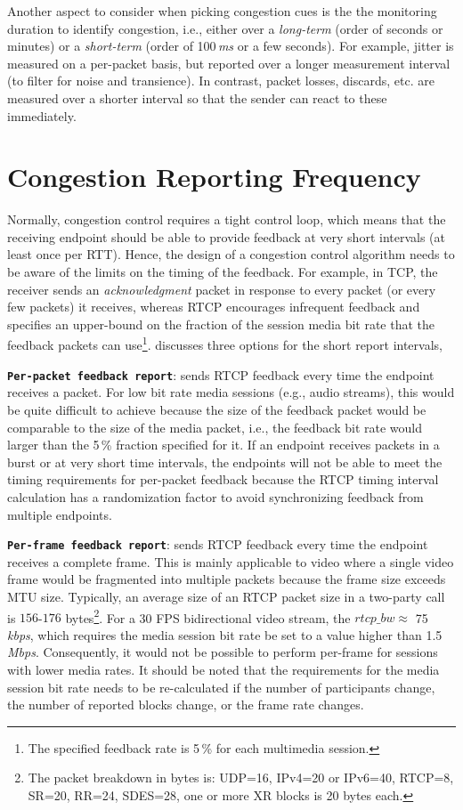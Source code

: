 Another aspect to consider when picking congestion cues is the the monitoring
duration to identify congestion, i.e., either over a \emph{long-term} (order
of seconds or minutes) or a \emph{short-term} (order of 100\,\emph{ms} or a
few seconds). For example, jitter is measured on a per-packet basis, but
reported over a longer measurement interval (to filter for noise and
transience). In contrast, packet losses, discards, etc. are measured over a
shorter interval so that the sender can react to these immediately.

\section{Congestion Reporting Frequency}
\label{fw.freq}

Normally, congestion control requires a tight control loop, which means that
the receiving endpoint should be able to provide feedback at very short
intervals (at least once per RTT). Hence, the design of a congestion control
algorithm needs to be aware of the limits on the timing of the feedback. For
example, in TCP, the receiver sends an \emph{acknowledgment} packet in
response to every packet (or every few packets) it receives, whereas RTCP
encourages infrequent feedback and specifies an upper-bound on the fraction of
the session media bit rate that the feedback packets can use\footnote{The
specified feedback rate is 5\,\% for each multimedia session.}.
\cite{draft.rmcat.feedback} discusses three options for the short report
intervals,

\textbf{\texttt{Per-packet feedback report}}: sends RTCP feedback every time
the endpoint receives a packet. For low bit rate media sessions (e.g., audio
streams), this would be quite difficult to achieve because the size of the
feedback packet would be comparable to the size of the media packet, i.e., the
feedback bit rate would larger than the 5\,\% fraction specified for it. If an
endpoint receives packets in a burst or at very short time intervals, the
endpoints will not be able to meet the timing requirements for per-packet
feedback because the RTCP timing interval calculation has a randomization
factor to avoid synchronizing feedback from multiple endpoints.

\textbf{\texttt{Per-frame feedback report}}: sends RTCP feedback every time
the endpoint receives a complete frame. This is mainly applicable to video
where a single video frame would be fragmented into multiple packets because
the frame size exceeds MTU size. Typically, an average size of an RTCP packet
size in a two-party call is $156$-$176$ bytes\footnote{The packet breakdown in
bytes is: UDP=16, IPv4=20 or IPv6=40, RTCP=8, SR=20, RR=24, SDES=28, one or
more XR blocks is 20 bytes each.}. For a 30 FPS bidirectional video stream, the
$rtcp\_bw \approx$ 75\,\emph{kbps}, which requires the media session bit rate
be set to a value higher than 1.5\,\emph{Mbps}. Consequently, it would not be
possible to perform per-frame for sessions with lower media rates. It should
be noted that the requirements for the media session bit rate needs to be 
re-calculated if the number of participants change, the number of reported
blocks change, or the frame rate changes.

